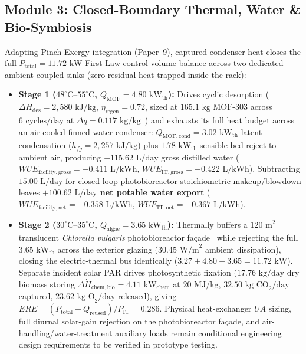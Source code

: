 \documentclass[10pt,twocolumn,a4paper]{article}
\begin{document}
\subsection{Module 3: Closed-Boundary Thermal, Water \& Bio-Symbiosis}
Adapting Pinch Exergy integration (Paper~9), captured condenser heat closes the full $P_{\mathrm{total}} = 11.72\text{ kW}$ First-Law control-volume balance across two dedicated ambient-coupled sinks (zero residual heat trapped inside the rack):
\begin{itemize}
\item \textbf{Stage 1 ($48^\circ\text{C}\text{--}55^\circ\text{C}$, $Q_{\mathrm{MOF}} = 4.80\text{ kW}_{\mathrm{th}}$):} Drives cyclic desorption ($\Delta H_{\mathrm{des}} = 2,580\text{ kJ/kg}$, $\eta_{\mathrm{regen}} = 0.72$, sized at $165.1\text{ kg}$ MOF-303 across $6\text{ cycles/day}$ at $\Delta q = 0.117\text{ kg/kg}$~\cite{hanikel2021,kitagawa2025}) and exhausts its full heat budget across an air-cooled finned water condenser: $Q_{\mathrm{MOF,cond}} = 3.02\text{ kW}_{\mathrm{th}}$ latent condensation ($h_{fg} = 2,257\text{ kJ/kg}$) plus $1.78\text{ kW}_{\mathrm{th}}$ sensible bed reject to ambient air, producing $+115.62\text{ L/day}$ gross distilled water ($WUE_{\mathrm{facility,gross}} = -0.411\text{ L/kWh}$, $WUE_{\mathrm{IT,gross}} = -0.422\text{ L/kWh}$). Subtracting $15.00\text{ L/day}$ for closed-loop photobioreactor stoichiometric makeup/blowdown leaves \textbf{$+100.62\text{ L/day}$ net potable water export} ($WUE_{\mathrm{facility,net}} = -0.358\text{ L/kWh}$, $WUE_{\mathrm{IT,net}} = -0.367\text{ L/kWh}$).
\item \textbf{Stage 2 ($30^\circ\text{C}\text{--}35^\circ\text{C}$, $Q_{\mathrm{algae}} = 3.65\text{ kW}_{\mathrm{th}}$):} Thermally buffers a $120\text{ m}^2$ translucent \textit{Chlorella vulgaris} photobioreactor fa\c{c}ade~\cite{baker2024} while rejecting the full $3.65\text{ kW}_{\mathrm{th}}$ across the exterior glazing ($30.45\text{ W/m}^2$ ambient dissipation), closing the electric-thermal bus identically ($3.27 + 4.80 + 3.65 = 11.72\text{ kW}$). Separate incident solar PAR drives photosynthetic fixation ($17.76\text{ kg/day}$ dry biomass storing $\Delta\dot{H}_{\mathrm{chem,bio}} = 4.11\text{ kW}_{\mathrm{chem}}$ at $20\text{ MJ/kg}$, $32.50\text{ kg CO}_2/\text{day}$ captured, $23.62\text{ kg O}_2/\text{day}$ released), giving $ERE = (P_{\mathrm{total}} - Q_{\mathrm{reused}})/P_{\mathrm{IT}} = 0.286$. Physical heat-exchanger $UA$ sizing, full diurnal solar-gain rejection on the photobioreactor fa\c{c}ade, and air-handling/water-treatment auxiliary loads remain conditional engineering design requirements to be verified in prototype testing.
\end{itemize}
\end{document}

